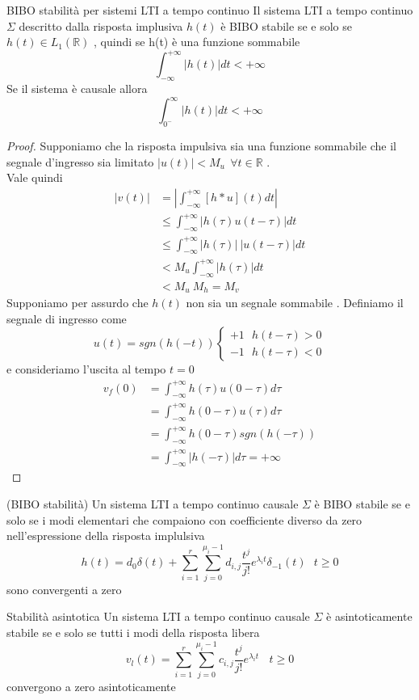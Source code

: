 \documentclass{article}
\theoremstyle{definition}
\newcommand{\R}{\mathbb{R}}
\newcommand{\la}{\lambda}
\newcommand{\intinf}{\int_{-\infty}^{+\infty}}
\begin{document}
		\begin{teo}{BIBO stabilità per sistemi LTI a tempo continuo}
			Il sistema LTI a tempo continuo $\Sigma$ descritto dalla risposta implusiva $h(t)$ è BIBO stabile se e solo se $h(t)\in L_1(\R)$ , quindi se h(t) è una funzione sommabile 
			$$\intinf |h(t)|dt < +\infty$$
			Se il sistema è causale allora 
			$$\int_{0^-}^{\infty}|h(t)|dt < +\infty$$
		\end{teo}
		\begin{proof}
Supponiamo che la risposta impulsiva sia una funzione sommabile  che il segnale d'ingresso sia limitato $|u(t)| < M_u \ \ \forall t \in \R$ . \\Vale quindi 	
\begin{align*}
	|v(t)|&=|\intinf [h*u](t) dt | \\
	&\leq \intinf |h(\tau)u(t-\tau)|dt \\
		&\leq \intinf |h(\tau)| \ |u(t-\tau)|dt \\
		&< M_u \intinf |h(\tau)| dt \\
		& < M_u \ M_h=M_v
	\end{align*}
Supponiamo per assurdo che $h(t)$ non sia un segnale sommabile . Definiamo il segnale di ingresso come 
$$u(t)=sgn(h(-t))\begin{cases}
	+1 \ \ \ h(t-\tau) >0 \\
	-1 \ \ \ h(t-\tau) < 0 
\end{cases}$$ e consideriamo l'uscita al tempo $t=0$ 
\begin{align*}
	v_f(0)&= \intinf h(\tau)u(0-\tau) d\tau \\
	&=\intinf h(0-\tau)u(\tau) d\tau \\
	&=\intinf h(0-\tau) sgn(h(-\tau)) \\
	&=\intinf |h(-\tau) | d\tau = +\infty 
\end{align*}
	\end{proof}
	\begin{teo}{(BIBO stabilità)}{}
		Un sistema LTI a tempo continuo causale $\Sigma$ è BIBO stabile se e solo se i modi elementari che compaiono con coefficiente diverso da zero nell'espressione della risposta implulsiva 
		$$h(t)=d_0 \delta(t)+\sum_{i=1}^{r}\sum_{j=0}^{\mu_i-1}d_{i,j}\frac{t^j}{j!}e^{\la_i t}\delta_{-1}(t) \ \ \ t \geq 0$$  
		sono convergenti a zero 
	\end{teo}
	\begin{teo}{Stabilità asintotica} {}
		Un sistema LTI a tempo continuo causale $\Sigma$ è asintoticamente stabile se e solo se tutti i modi della risposta libera 
		$$v_l(t)=\sum_{i=1}^{r}\sum_{j=0}^{\mu_i-1}c_{i,j}\frac{t^j}{j!}e^{\la_i t}\ \ \ \ t \geq 0$$
convergono a zero asintoticamente 
	\end{teo}
	\newpage
\end{document}

